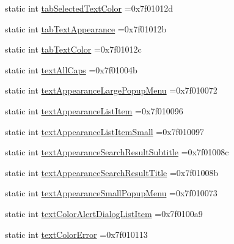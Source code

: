 \begin{DoxyCompactItemize}
\item 
static int \hyperlink{classandroid_1_1support_1_1graphics_1_1drawable_1_1animated_1_1R_1_1attr_afbcb532efe89eda93d1059c02f3f22db}{tab\+Selected\+Text\+Color} =0x7f01012d
\item 
static int \hyperlink{classandroid_1_1support_1_1graphics_1_1drawable_1_1animated_1_1R_1_1attr_aab7253254bbdd600a4d0155993e04a35}{tab\+Text\+Appearance} =0x7f01012b
\item 
static int \hyperlink{classandroid_1_1support_1_1graphics_1_1drawable_1_1animated_1_1R_1_1attr_a7a9094e523553b6cb29fc56de8bd58d2}{tab\+Text\+Color} =0x7f01012c
\item 
static int \hyperlink{classandroid_1_1support_1_1graphics_1_1drawable_1_1animated_1_1R_1_1attr_aa3a0d111ce6420ea26055ef75abd7b35}{text\+All\+Caps} =0x7f01004b
\item 
static int \hyperlink{classandroid_1_1support_1_1graphics_1_1drawable_1_1animated_1_1R_1_1attr_ab5e31a6477223315b79de2faa28546a0}{text\+Appearance\+Large\+Popup\+Menu} =0x7f010072
\item 
static int \hyperlink{classandroid_1_1support_1_1graphics_1_1drawable_1_1animated_1_1R_1_1attr_a7c7194399d54c69806f6c953c2ea9dff}{text\+Appearance\+List\+Item} =0x7f010096
\item 
static int \hyperlink{classandroid_1_1support_1_1graphics_1_1drawable_1_1animated_1_1R_1_1attr_a2b761579bf932cd3f3b41d8e02f39feb}{text\+Appearance\+List\+Item\+Small} =0x7f010097
\item 
static int \hyperlink{classandroid_1_1support_1_1graphics_1_1drawable_1_1animated_1_1R_1_1attr_a988d6759443c5ba3c32db957a7222266}{text\+Appearance\+Search\+Result\+Subtitle} =0x7f01008c
\item 
static int \hyperlink{classandroid_1_1support_1_1graphics_1_1drawable_1_1animated_1_1R_1_1attr_a2705f66f605bee168da7385b75eb37ba}{text\+Appearance\+Search\+Result\+Title} =0x7f01008b
\item 
static int \hyperlink{classandroid_1_1support_1_1graphics_1_1drawable_1_1animated_1_1R_1_1attr_ac9d26efc14c42d54c73e9b87ce9c3f32}{text\+Appearance\+Small\+Popup\+Menu} =0x7f010073
\item 
static int \hyperlink{classandroid_1_1support_1_1graphics_1_1drawable_1_1animated_1_1R_1_1attr_a0675f9bd6724ce6087c5b531ff2e8573}{text\+Color\+Alert\+Dialog\+List\+Item} =0x7f0100a9
\item 
static int \hyperlink{classandroid_1_1support_1_1graphics_1_1drawable_1_1animated_1_1R_1_1attr_ae25599e44c1f5cfa4096a4d9403aa127}{text\+Color\+Error} =0x7f010113

\end{DoxyCompactItemize}
